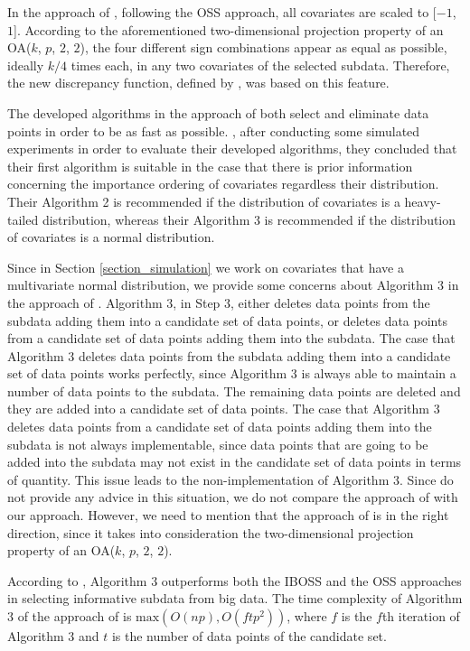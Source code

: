 \documentclass[12pt]{article}
\theoremstyle{definition}
\begin{document}
	In the approach of \cite{ren&zhao}, following the OSS approach, all covariates are scaled to [$-1$, $1$]. According to the aforementioned two-dimensional projection property of an OA($k$, $p$, $2$, $2$), the four different sign combinations appear as equal as possible, ideally $k/4$ times each, in any two covariates of the selected subdata. Therefore, the new discrepancy function, defined by \cite{ren&zhao}, was based on this feature. 
	
	The developed algorithms in the approach of \cite{ren&zhao} both select and eliminate data points in order to be as fast as possible. \cite{ren&zhao}, after conducting some simulated experiments in order to evaluate their developed algorithms, they concluded that their first algorithm is suitable in the case that there is prior information
	concerning the importance ordering of covariates regardless their distribution. Their Algorithm 2 is recommended if the distribution of covariates is a heavy-tailed distribution, whereas their Algorithm 3 is recommended if the distribution of covariates is a normal distribution.
	
	Since in Section \ref{section_simulation} we work on covariates that have a multivariate normal distribution, we provide some concerns about Algorithm 3 in the approach of \cite{ren&zhao}. Algorithm 3, in Step 3, either deletes data points from the subdata adding them into a candidate set of data points, or deletes data points from a candidate set of data points adding them into the subdata. The case that Algorithm 3 deletes data points from the subdata adding them into a candidate set of data points works perfectly, since Algorithm 3 is always able to maintain a number of data points to the subdata. The remaining data points are deleted and they are added into a candidate set of data points. The case that Algorithm 3 deletes data points from a candidate set of data points adding them into the subdata is not always implementable, since data points that are going to be added into the subdata may not exist in the candidate set of data points in terms of quantity. This issue leads to the non-implementation of Algorithm 3. Since \cite{ren&zhao} do not provide any advice in this situation, we do not compare the approach of \cite{ren&zhao} with our approach. However, we need to mention that the approach of \cite{ren&zhao} is in the right direction, since it takes into consideration the two-dimensional projection property of an OA($k$, $p$, $2$, $2$).
	
	According to \cite{ren&zhao}, Algorithm 3 outperforms both the IBOSS and the OSS approaches in selecting informative subdata from big data. The time complexity of Algorithm 3 of the approach of \cite{ren&zhao} is $\text{max}\left(O(np),O(ftp^2)\right)$, where $f$ is the $f$th iteration of Algorithm 3 and $t$ is the number of data points of the candidate set.
	
\end{document}
